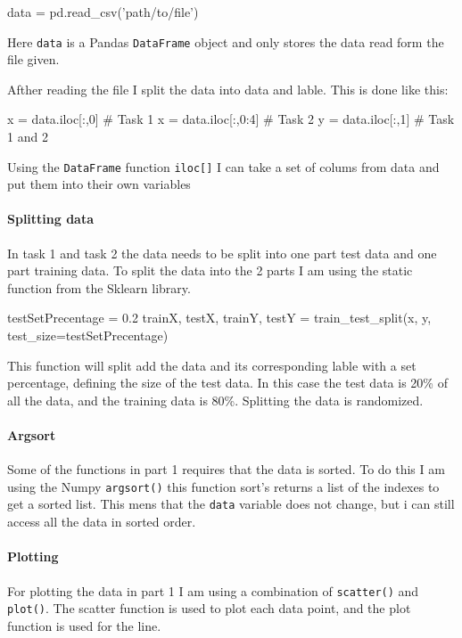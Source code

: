 \documentclass[11pt]{article}
\begin{document}
        \begin{pythoncode}
    data = pd.read_csv('path/to/file')
        \end{pythoncode}

        Here \texttt{data} is a Pandas \texttt{DataFrame} object and only stores the data read form the file given.

        Afther reading the file I split the data into data and lable. This is done like this:

        \begin{pythoncode}
    x = data.iloc[:,0]   # Task 1
    x = data.iloc[:,0:4] # Task 2
    y = data.iloc[:,1]   # Task 1 and 2
        \end{pythoncode}

        Using the \texttt{DataFrame} function \texttt{iloc[]} I can take a set of colums from data and put them into their own variables

        \paragraph{Splitting data}
        In task 1 and task 2 the data needs to be split into one part test data and one part training data. To split the data into the 2 parts I am using the static function from the Sklearn library.

        \begin{pythoncode}
    testSetPrecentage = 0.2
    trainX, testX, trainY, testY = 
        train_test_split(x, y, test_size=testSetPrecentage)
        \end{pythoncode}

        This function will split add the data and its corresponding lable with a set percentage, defining the size of the test data. In this case the test data is 20\% of all the data, and the training data is 80\%. Splitting the data is randomized.

        \paragraph{Argsort}
        Some of the functions in part 1 requires that the data is sorted. To do this I am using the Numpy \texttt{argsort()} this function sort's returns a list of the indexes to get a sorted list. This mens that the \texttt{data} variable does not change, but i can still access all the data in sorted order.

        \paragraph{Plotting}
        For plotting the data in part 1 I am using a combination of \texttt{scatter()} and \texttt{plot()}. The scatter function is used to plot each data point, and the plot function is used for the line.
\end{document}
